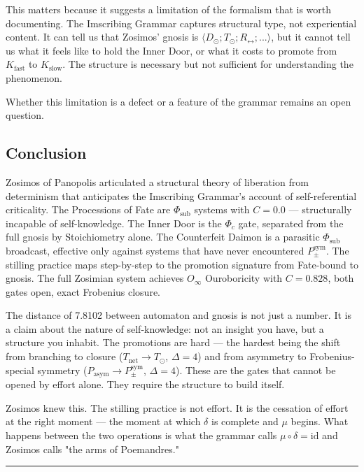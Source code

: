 \documentclass[12pt,a4paper]{article}
\begin{document}
This matters because it suggests a limitation of the formalism that is worth documenting. The Imscribing Grammar captures structural type, not experiential content. It can tell us that Zosimos' gnosis is $\langle D_{\odot}; T_{\odot}; R_{\leftrightarrow}; ... \rangle$, but it cannot tell us what it feels like to hold the Inner Door, or what it costs to promote from $K_\text{fast}$ to $K_\text{slow}$. The structure is necessary but not sufficient for understanding the phenomenon.

Whether this limitation is a defect or a feature of the grammar remains an open question.

\subsection{Conclusion}

Zosimos of Panopolis articulated a structural theory of liberation from determinism that anticipates the Imscribing Grammar's account of self-referential criticality. The Processions of Fate are $\Phi_\text{sub}$ systems with $C = 0.0$ --- structurally incapable of self-knowledge. The Inner Door is the $\Phi_c$ gate, separated from the full gnosis by Stoichiometry alone. The Counterfeit Daimon is a parasitic $\Phi_\text{sub}$ broadcast, effective only against systems that have never encountered $P_{\pm}^{\text{sym}}$. The stilling practice maps step-by-step to the promotion signature from Fate-bound to gnosis. The full Zosimian system achieves $O_{\infty}$ Ouroboricity with $C = 0.828$, both gates open, exact Frobenius closure.

The distance of 7.8102 between automaton and gnosis is not just a number. It is a claim about the nature of self-knowledge: not an insight you have, but a structure you inhabit. The promotions are hard --- the hardest being the shift from branching to closure ($T_\text{net} \to T_{\odot}$, $\Delta = 4$) and from asymmetry to Frobenius-special symmetry ($P_\text{asym} \to P_{\pm}^{\text{sym}}$, $\Delta = 4$). These are the gates that cannot be opened by effort alone. They require the structure to build itself.

Zosimos knew this. The stilling practice is not effort. It is the cessation of effort at the right moment --- the moment at which $\delta$ is complete and $\mu$ begins. What happens between the two operations is what the grammar calls $\mu \circ \delta = \text{id}$ and Zosimos calls "the arms of Poemandres."

\begin{center}
\rule{0.5\textwidth}{0.4pt}
\end{center}
\end{document}
